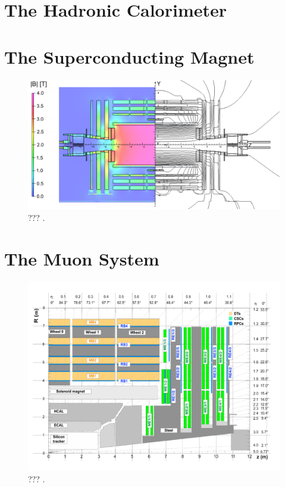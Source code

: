   \section{The Hadronic Calorimeter}

  \section{The Superconducting Magnet}

    \begin{figure}[h!]
      \centering
      \includegraphics[width=\textwidth]{img/I-3-cms/magnet.png}
      \caption{??? \cite{Chatrchyan:2009si}.}
      \label{fig:I-3-cms-magnet}
    \end{figure}

  \section{The Muon System}

    \begin{figure}[h!]
      \centering
      \includegraphics[width=\textwidth]{img/I-3-cms/quadrant-postls1.pdf}
      \caption{??? \cite{1748-0221-3-08-S08004}.}
      \label{fig:I-3-cms-quadrant}
    \end{figure}

